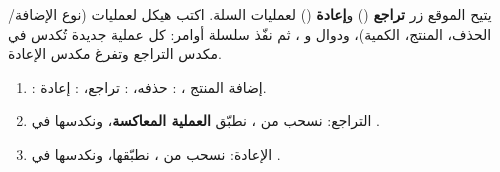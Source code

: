 \begin{statement}
يتيح الموقع زر \textbf{تراجع} () و\textbf{إعادة} () لعمليات السلة. اكتب هيكل  لعمليات  (نوع الإضافة/الحذف، المنتج، الكمية)، ودوال  و ، ثم نفّذ سلسلة أوامر: كل عملية جديدة تُكدس في مكدس التراجع وتفرغ مكدس الإعادة.
\end{statement}
\begin{stepsbox}\begin{enumerate}
\item {}: إضافة المنتج ، : حذفه، : تراجع، : إعادة.
\item التراجع: نسحب من ، نطبّق \textbf{العملية المعاكسة}، ونكدسها في .
\item الإعادة: نسحب من ، نطبّقها، ونكدسها في .
\end{enumerate}\end{stepsbox}
